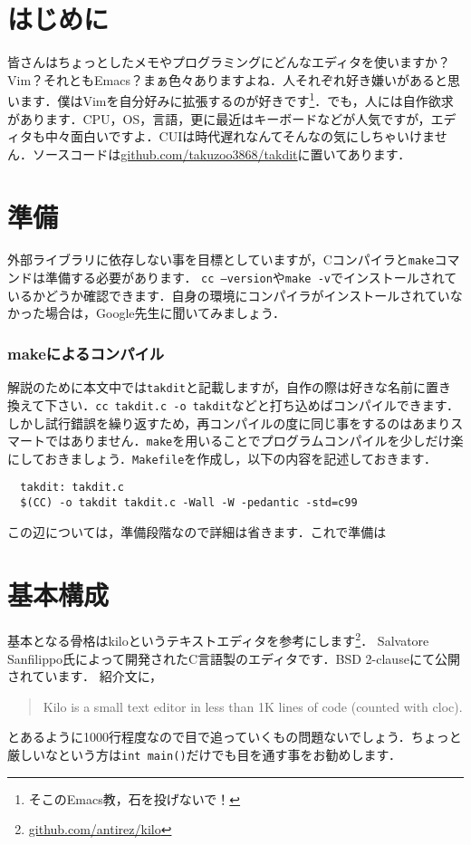 \section{はじめに}
皆さんはちょっとしたメモやプログラミングにどんなエディタを使いますか？Vim？それともEmacs？まぁ色々ありますよね．人それぞれ好き嫌いがあると思います．僕はVimを自分好みに拡張するのが好きです\footnote{そこのEmacs教，石を投げないで！}．でも，人には自作欲求があります．CPU，OS，言語，更に最近はキーボードなどが人気ですが，エディタも中々面白いですよ．CUIは時代遅れなんてそんなの気にしちゃいけません．ソースコードは\href{https://github.com/takuzoo3868/takdit}{github.com/takuzoo3868/takdit}に置いてあります．

\section{準備}



外部ライブラリに依存しない事を目標としていますが，Cコンパイラと\texttt{make}コマンドは準備する必要があります．
\texttt{cc --version}や\texttt{make -v}でインストールされているかどうか確認できます．自身の環境にコンパイラがインストールされていなかった場合は，Google先生に聞いてみましょう．

\subsubsection{makeによるコンパイル}
解説のために本文中では\texttt{takdit}と記載しますが，自作の際は好きな名前に置き換えて下さい．\texttt{cc takdit.c -o takdit}などと打ち込めばコンパイルできます．しかし試行錯誤を繰り返すため，再コンパイルの度に同じ事をするのはあまりスマートではありません．\texttt{make}を用いることでプログラムコンパイルを少しだけ楽にしておきましょう．\texttt{Makefile}を作成し，以下の内容を記述しておきます．
\begin{verbatim}
  takdit: takdit.c
  $(CC) -o takdit takdit.c -Wall -W -pedantic -std=c99
\end{verbatim}
この辺については，準備段階なので詳細は省きます．これで準備は

\section{基本構成}
基本となる骨格はkiloというテキストエディタを参考にします\footnote{\href{https://github.com/antirez/kilo}{github.com/antirez/kilo}}．
Salvatore Sanfilippo氏によって開発されたC言語製のエディタです．BSD 2-clauseにて公開されています．
紹介文に，
\begin{quote}
  Kilo is a small text editor in less than 1K lines of code (counted with cloc).
\end{quote}
とあるように1000行程度なので目で追っていくもの問題ないでしょう．ちょっと厳しいなという方は\texttt{int main()}だけでも目を通す事をお勧めします．

